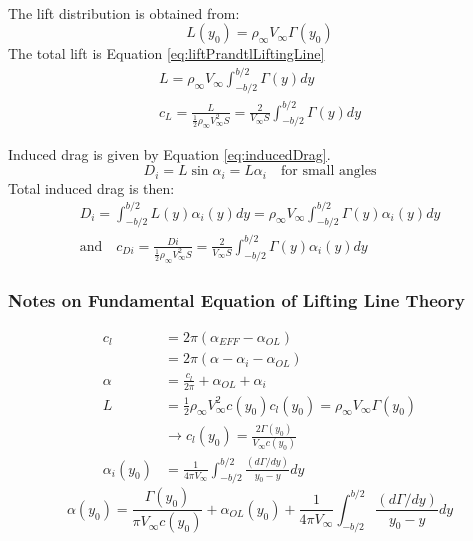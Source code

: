 \documentclass[draft=false, titlepage]{article}
\begin{document}
\paragraph*{} The lift distribution is obtained from:
\begin{equation*}
    L(y_0) = \rho_\infty V_\infty \Gamma(y_0)
\end{equation*}
The total lift is Equation \ref{eq:liftPrandtlLiftingLine}
\begin{gather}
    L = \rho_\infty V_\infty \int_{-b/2}^{b/2} \Gamma(y) dy\\
    c_L = \frac{L}{\frac{1}{2}\rho_\infty V_\infty^2 S} = \frac{2}{V_\infty S} \int_{-b/2}^{b/2} \Gamma(y) dy
    \label{eq:liftPrandtlLiftingLine}
\end{gather}

Induced drag is given by Equation \ref{eq:inducedDrag}.
\begin{equation}
    D_i = L\sin\alpha_i = L\alpha_i \quad \text{for small angles}
    \label{eq:inducedDrag}
\end{equation}
Total induced drag is then:
\begin{gather*}
    D_i = \int_{-b/2}^{b/2} L(y) \alpha_i(y) dy = \rho_\infty V_\infty \int_{-b/2}^{b/2} \Gamma(y) \alpha_i(y) dy\\
    \text{and} \quad c_{Di} = \frac{Di}{\frac{1}{2}\rho_\infty V_\infty^2 S} = \frac{2}{V_\infty S} \int_{-b/2}^{b/2} \Gamma(y) \alpha_i(y) dy
\end{gather*}

\subsubsection{Notes on Fundamental Equation of Lifting Line Theory}
\begin{align*}
    c_l &= 2\pi (\alpha_{EFF} - \alpha_{OL})\\
    &= 2\pi (\alpha - \alpha_i - \alpha_{OL})\\
    \alpha &= \frac{c_l}{2\pi} + \alpha_{OL} + \alpha_i\\
    L &= \frac{1}{2}\rho_\infty V_\infty^2 c(y_0) c_l(y_0) = \rho_\infty V_\infty \Gamma(y_0)\\
    &\rightarrow c_l(y_0) = \frac{2\Gamma(y_0)}{V_\infty c(y_0)}\\
    \alpha_i(y_0) &= \frac{1}{4\pi V_\infty} \int_{-b/2}^{b/2} \frac{(d\Gamma/dy)}{y_0-y}dy
\end{align*}
\begin{equation*}
    \alpha(y_0) = \frac{\Gamma(y_0)}{\pi V_\infty c(y_0)} + \alpha_{OL}(y_0) + \frac{1}{4\pi V_\infty} \int_{-b/2}^{b/2} \frac{(d\Gamma/dy)}{y_0-y}dy
\end{equation*}
\end{document}
